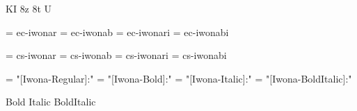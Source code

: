 
\ifx\ffdecl\undefined  \fi

\ffdecl [Iwona] {\caps \cond \lightw \heavyw} {\rm \bf \it \bi} {} {KI} {8z 8t U}

\def\caps{\ffsetV{caps}{-sc}\ffsetX}  \def\nocaps{\ffsetV{caps}{}\ffsetX}
\def\cond{\ffsetV{cond}{c}\ffsetX}    \def\nocond{\ffsetV{cond}{}\ffsetX}
\def\capsV{} 
\def\condV{} 
\def\lightw{\ffvars{l}{m}{li}{mi}\ffsetX}
\def\heavyw{\ffvars{h}{!}{hi}{!}\ffsetX}
\def\normalw{\ffvars {r}{b}{ri}{bi}\ffsetX}

\ismacro{}\ifttrue

   \font\tenrm = ec-iwonar  \sizespec
   \font\tenbf = ec-iwonab  \sizespec
   \font\tenit = ec-iwonari \sizespec
   \font\tenbi = ec-iwonabi \sizespec

   \def\ffnamegen{ec-iwona\condV\ffvarV\capsV}

\fi

\ismacro{}\iftrue

   \font\tenrm = cs-iwonar  \sizespec
   \font\tenbf = cs-iwonab  \sizespec
   \font\tenit = cs-iwonari \sizespec
   \font\tenbi = cs-iwonabi \sizespec

   \def\ffnamegen{cs-iwona\condV\ffvarV\capsV}
   

\fi

\ismacro{}\iftrue

   \font\tenrm = "[Iwona-Regular]:\fontfeatures"    \sizespec
   \font\tenbf = "[Iwona-Bold]:\fontfeatures"       \sizespec
   \font\tenit = "[Iwona-Italic]:\fontfeatures"     \sizespec
   \font\tenbi = "[Iwona-BoldItalic]:\fontfeatures" \sizespec

   \def\ffnamegen{"[Iwona\condV\ffvarxV-\ffvarV]:\capsV\fontfeatures"} 

    {Bold} {Italic} {BoldItalic}
   \def\caps{\ffsetV{caps}{+smcp;}\ffsetX}
   \def\cond{\ffsetV{cond}{Cond}\ffsetX}
   \def\lightw{\ffvarsx{Light}{Medium}{Light}{Medium}%
      \ffvars{Regular}{Regular}{Italic}{Italic}\ffsetX}
   \def\heavyw{\ffvarsx{Heavy}{}{Heavy}{}\ffvars{Regular}{!}{Italic}{!}\ffsetX}
   \def\normalw{\ffvarsx{}{}{}{}\ffvars{Regular}{Bold}{Italic}{BoldItalic}\ffsetX}

   \tryprotected\def\ffvarsx#1#2#3#4{%
      \def\ffvarxY##1{\ifcase##1 #1\or#2\or#3\or#4\fi}%
   }
   \def\ffsetR#1{\edef\ffvarxV{\ffvarxY{#1}}}
   \ffvarsx {}{}{}{}

\fi
\tenrm %

\def\narrow{\cond\fam}

\ifx\loadmathfonts\relax \endinput \fi
\def\mfamname{iwona}
\ifx\mathpreloaded R \normalmath \else  \fi                     

